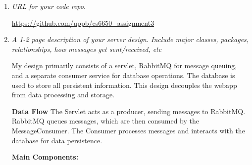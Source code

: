 \documentclass[a4paper,12pt]{article} %
\begin{document}
\begin{enumerate}

\item {\it URL for your code repo}. %

\href{https://github.com/uppb/cs6650_assignment3}{https://github.com/uppb/cs6650\_assignment3}

\item {\it A 1-2 page description of your server design. Include major classes, packages, relationships, how messages get sent/received, etc}

My design primarily consists of a servlet, RabbitMQ for message queuing, and a separate consumer service for database operations. The database is used to store all persistent information. 
This design decouples the webapp from data processing and storage.

\textbf{Data Flow}
The Servlet acts as a producer, sending messages to RabbitMQ.
RabbitMQ queues messages, which are then consumed by the MessageConsumer.
The Consumer processes messages and interacts with the database for data persistence.

\textbf{Main Components:}


\end{enumerate}
\end{document}
